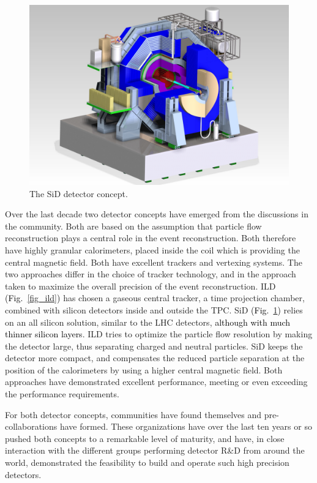 \documentclass[%
 reprint,
 amsmath,amssymb,
 aps,
]{revtex4-1}
\newcommand{\jim}[1]{\textcolor{black}{#1}}
\def\Fig#1{Fig.~\ref{#1}}
\begin{document}
\begin{figure}[tb]
 \begin{center}
 \includegraphics[width=\hsize]{figures/SiD.pdf}
\caption{The SiD detector concept.
\label{fig_sid}}
 \end{center}
 \end{figure}


Over the last decade two detector concepts have emerged from the discussions in the community. Both are based on the assumption that particle flow reconstruction plays a central role in the event reconstruction. Both therefore have highly granular calorimeters, placed inside the coil which is providing the central magnetic field. Both have excellent trackers and vertexing systems. The two approaches differ in the choice of tracker technology, and in the approach taken to maximize the overall precision of the event reconstruction. ILD \jim{(\Fig{fig_ild}) } has chosen a gaseous central tracker, a time projection chamber, combined with silicon detectors inside and outside the TPC. SiD \jim{(\Fig{fig_sid}) } relies on an all silicon solution, similar to the LHC detectors, \jim{although with
much thinner silicon layers}. ILD tries to optimize the particle flow resolution by making the detector large, thus separating charged and neutral particles. SiD keeps the detector more compact, and compensates the reduced particle separation at the position of the calorimeters by using a higher central magnetic field. Both approaches have demonstrated excellent performance, meeting or even exceeding the performance requirements. 



For both detector concepts, communities have found themselves and pre-collaborations have formed. These organizations have over the last ten years or so pushed both concepts to a remarkable level of maturity, and have, in close interaction with the different groups performing detector R\&D from around the world, demonstrated the feasibility to build and operate such high precision detectors. 
\end{document}
